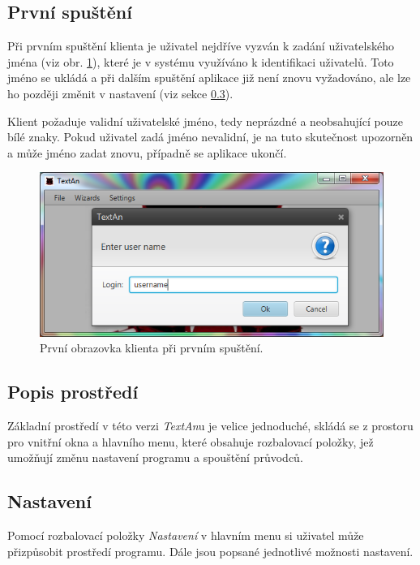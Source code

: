 \documentclass[12pt,a4paper]{report}
\newcommand{\textan}{\emph{TextAn}}
\begin{document}
\subsection{První spuštění}
Při prvním spuštění klienta je uživatel nejdříve vyzván k zadání uživatelského jména (viz obr. \ref{fig:First}), které je v systému využíváno k identifikaci uživatelů. Toto jméno se ukládá a při dalším spuštění aplikace již není znovu vyžadováno, ale lze ho později změnit v nastavení (viz sekce \ref{sec:Nastaveni}).

Klient požaduje validní uživatelské jméno, tedy neprázdné a neobsahující pouze bílé znaky. Pokud uživatel zadá jméno nevalidní, je na tuto skutečnost upozorněn a může jméno zadat znovu, případně se aplikace ukončí.

\begin{figure}[!htb]
	\centering
	\includegraphics[width=\textwidth]{first}
	\caption{První obrazovka klienta při prvním spuštění.}
	\label{fig:First}
\end{figure}

\subsection{Popis prostředí}
Základní prostředí v této verzi \textan u je velice jednoduché, skládá se z prostoru pro vnitřní okna a hlavního menu, které obsahuje rozbalovací položky, jež umožňují změnu nastavení programu a spouštění průvodců.


\subsection{Nastavení}
\label{sec:Nastaveni}
Pomocí rozbalovací položky \emph{Nastavení} v hlavním menu si uživatel může přizpůsobit prostředí programu. Dále jsou popsané jednotlivé možnosti nastavení.
\end{document}
